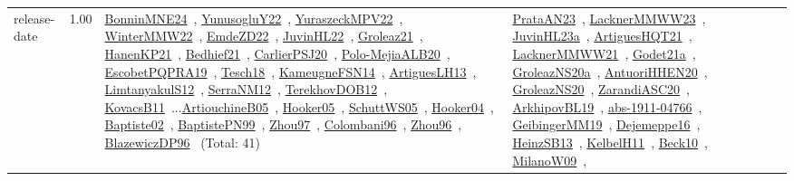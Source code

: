 {\begin{longtable}{p{3cm}r>{\raggedright\arraybackslash}p{6cm}>{\raggedright\arraybackslash}p{6cm}>{\raggedright\arraybackslash}p{8cm}}
\index{release-date}\index{Concepts!release-date}release-date &  1.00 & \href{../works/BonninMNE24.pdf}{BonninMNE24}~\cite{BonninMNE24}, \href{../works/YunusogluY22.pdf}{YunusogluY22}~\cite{YunusogluY22}, \href{../works/YuraszeckMPV22.pdf}{YuraszeckMPV22}~\cite{YuraszeckMPV22}, \href{../works/WinterMMW22.pdf}{WinterMMW22}~\cite{WinterMMW22}, \href{../works/EmdeZD22.pdf}{EmdeZD22}~\cite{EmdeZD22}, \href{../works/JuvinHL22.pdf}{JuvinHL22}~\cite{JuvinHL22}, \href{../works/Groleaz21.pdf}{Groleaz21}~\cite{Groleaz21}, \href{../works/HanenKP21.pdf}{HanenKP21}~\cite{HanenKP21}, \href{../works/Bedhief21.pdf}{Bedhief21}~\cite{Bedhief21}, \href{../works/CarlierPSJ20.pdf}{CarlierPSJ20}~\cite{CarlierPSJ20}, \href{../works/Polo-MejiaALB20.pdf}{Polo-MejiaALB20}~\cite{Polo-MejiaALB20}, \href{../works/EscobetPQPRA19.pdf}{EscobetPQPRA19}~\cite{EscobetPQPRA19}, \href{../works/Tesch18.pdf}{Tesch18}~\cite{Tesch18}, \href{../works/KameugneFSN14.pdf}{KameugneFSN14}~\cite{KameugneFSN14}, \href{../works/ArtiguesLH13.pdf}{ArtiguesLH13}~\cite{ArtiguesLH13}, \href{../works/LimtanyakulS12.pdf}{LimtanyakulS12}~\cite{LimtanyakulS12}, \href{../works/SerraNM12.pdf}{SerraNM12}~\cite{SerraNM12}, \href{../works/TerekhovDOB12.pdf}{TerekhovDOB12}~\cite{TerekhovDOB12}, \href{../works/KovacsB11.pdf}{KovacsB11}~\cite{KovacsB11}...\href{../works/ArtiouchineB05.pdf}{ArtiouchineB05}~\cite{ArtiouchineB05}, \href{../works/Hooker05.pdf}{Hooker05}~\cite{Hooker05}, \href{../works/SchuttWS05.pdf}{SchuttWS05}~\cite{SchuttWS05}, \href{../works/Hooker04.pdf}{Hooker04}~\cite{Hooker04}, \href{../works/Baptiste02.pdf}{Baptiste02}~\cite{Baptiste02}, \href{../works/BaptistePN99.pdf}{BaptistePN99}~\cite{BaptistePN99}, \href{../works/Zhou97.pdf}{Zhou97}~\cite{Zhou97}, \href{../works/Colombani96.pdf}{Colombani96}~\cite{Colombani96}, \href{../works/Zhou96.pdf}{Zhou96}~\cite{Zhou96}, \href{../works/BlazewiczDP96.pdf}{BlazewiczDP96}~\cite{BlazewiczDP96} (Total: 41) & \href{../works/PrataAN23.pdf}{PrataAN23}~\cite{PrataAN23}, \href{../works/LacknerMMWW23.pdf}{LacknerMMWW23}~\cite{LacknerMMWW23}, \href{../works/JuvinHL23a.pdf}{JuvinHL23a}~\cite{JuvinHL23a}, \href{../works/ArtiguesHQT21.pdf}{ArtiguesHQT21}~\cite{ArtiguesHQT21}, \href{../works/LacknerMMWW21.pdf}{LacknerMMWW21}~\cite{LacknerMMWW21}, \href{../works/Godet21a.pdf}{Godet21a}~\cite{Godet21a}, \href{../works/GroleazNS20a.pdf}{GroleazNS20a}~\cite{GroleazNS20a}, \href{../works/AntuoriHHEN20.pdf}{AntuoriHHEN20}~\cite{AntuoriHHEN20}, \href{../works/GroleazNS20.pdf}{GroleazNS20}~\cite{GroleazNS20}, \href{../works/ZarandiASC20.pdf}{ZarandiASC20}~\cite{ZarandiASC20}, \href{../works/ArkhipovBL19.pdf}{ArkhipovBL19}~\cite{ArkhipovBL19}, \href{../works/abs-1911-04766.pdf}{abs-1911-04766}~\cite{abs-1911-04766}, \href{../works/GeibingerMM19.pdf}{GeibingerMM19}~\cite{GeibingerMM19}, \href{../works/Dejemeppe16.pdf}{Dejemeppe16}~\cite{Dejemeppe16}, \href{../works/HeinzSB13.pdf}{HeinzSB13}~\cite{HeinzSB13}, \href{../works/KelbelH11.pdf}{KelbelH11}~\cite{KelbelH11}, \href{../works/Beck10.pdf}{Beck10}~\cite{Beck10}, \href{../works/MilanoW09.pdf}{MilanoW09}~\cite{MilanoW09}, 
\end{longtable}}
